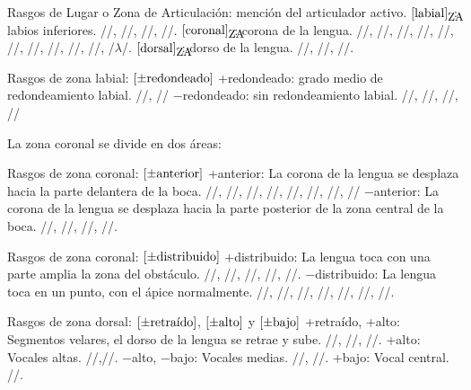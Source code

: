 \documentclass[12pt]{article}
\def\feat#1{$[\pm\hbox{#1}]$}%
\def\ZA#1{$[\hbox{#1}]_{\rlap{\small ZA}}$}%
\begin{document}
	\pex Rasgos de Lugar o Zona de Articulación: mención del articulador activo.
\a \ZA{labial} \quad: labios inferiores. //, //, //, //.
\a \ZA{coronal} \quad: corona de la lengua. //, //, //, //, //, //, //, /\texttoptiebar{\textteshlig}/, //, /\textltailn/, /$\lambda$/.
\a \ZA{dorsal} \quad : dorso de la lengua. //, //, //.
\xe




\pex Rasgos de zona labial: \feat{redondeado}
\a	+redondeado: grado medio de redondeamiento labial. //, //
\a	$-$redondeado: sin redondeamiento labial. //, //, //, //
\xe	






	La zona coronal se divide en dos áreas:
	\begin{center}
		\end{center}	



	\pex Rasgos de zona coronal: \feat{anterior}
\a	+anterior: La corona de la lengua se desplaza hacia la parte delantera de la boca. //, //, //, //, //, //, //, //
\a	$-$anterior: La corona de la lengua se desplaza hacia la parte posterior de la zona central de la boca. /\texttoptiebar{\textteshlig}/, //, //, /\textltailn/.
\xe




	\pex	Rasgos de zona coronal: \feat{distribuido}
\a	+distribuido: La lengua toca con una parte amplia la zona del obstáculo. //, //, //, //, /\textltailn/.
\a $-$distribuido: La lengua toca en un punto, con el ápice normalmente. //, //, /\texttoptiebar{\textteshlig}/, //, //, //, //. 
\xe




	\pex	Rasgos de zona dorsal: \feat{retraído}, \feat{alto} y \feat{bajo}
\a +retraído, +alto: Segmentos velares, el dorso de la lengua se retrae y sube. //, //, //.
\a	+alto: Vocales altas. //,//.
\a $-$alto, $-$bajo: Vocales medias. //, //.
\a +bajo: Vocal central. //.
\xe
\end{document}
